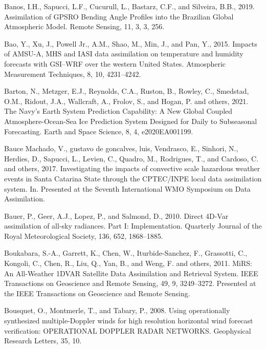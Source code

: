 \documentclass[12pt,oneside,a4paper]{reedthesis}
\begin{document}
\leavevmode\hypertarget{ref-banos2019}{}%
Banos, I.H., Sapucci, L.F., Cucurull, L., Bastarz, C.F., and Silveira, B.B., 2019. Assimilation of GPSRO Bending Angle Profiles into the Brazilian Global Atmospheric Model. Remote Sensing, 11, 3, 3, 256.

\leavevmode\hypertarget{ref-bao2015}{}%
Bao, Y., Xu, J., Powell Jr., A.M., Shao, M., Min, J., and Pan, Y., 2015. Impacts of AMSU-A, MHS and IASI data assimilation on temperature and humidity forecasts with GSI--WRF over the western United States. Atmospheric Measurement Techniques, 8, 10, 4231--4242.

\leavevmode\hypertarget{ref-barton2021}{}%
Barton, N., Metzger, E.J., Reynolds, C.A., Ruston, B., Rowley, C., Smedstad, O.M., Ridout, J.A., Wallcraft, A., Frolov, S., and Hogan, P. and others, 2021. The Navy's Earth System Prediction Capability: A New Global Coupled Atmosphere-Ocean-Sea Ice Prediction System Designed for Daily to Subseasonal Forecasting. Earth and Space Science, 8, 4, e2020EA001199.

\leavevmode\hypertarget{ref-baucemachado2017}{}%
Bauce Machado, V., gustavo de goncalves, luis, Vendrasco, E., Sinhori, N., Herdies, D., Sapucci, L., Levien, C., Quadro, M., Rodrigues, T., and Cardoso, C. and others, 2017. Investigating the impacts of convective scale hazardous weather events in Santa Catarina State through the CPTEC/INPE local data assimilation system. In. Presented at the Seventh International WMO Symposium on Data Assimilation.

\leavevmode\hypertarget{ref-bauer2010}{}%
Bauer, P., Geer, A.J., Lopez, P., and Salmond, D., 2010. Direct 4D-Var assimilation of all-sky radiances. Part I: Implementation. Quarterly Journal of the Royal Meteorological Society, 136, 652, 1868--1885.

\leavevmode\hypertarget{ref-boukabara2011}{}%
Boukabara, S.-A., Garrett, K., Chen, W., Iturbide-Sanchez, F., Grassotti, C., Kongoli, C., Chen, R., Liu, Q., Yan, B., and Weng, F. and others, 2011. MiRS: An All-Weather 1DVAR Satellite Data Assimilation and Retrieval System. IEEE Transactions on Geoscience and Remote Sensing, 49, 9, 3249--3272. Presented at the IEEE Transactions on Geoscience and Remote Sensing.

\leavevmode\hypertarget{ref-bousquet2008}{}%
Bousquet, O., Montmerle, T., and Tabary, P., 2008. Using operationally synthesized multiple-Doppler winds for high resolution horizontal wind forecast verification: OPERATIONAL DOPPLER RADAR NETWORKS. Geophysical Research Letters, 35, 10.
\end{document}
